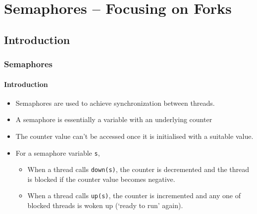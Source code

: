 \documentclass[aspectratio=169, handout, 10pt]{beamer}
\theoremstyle{example}
\begin{document}
\section{Semaphores -- Focusing on Forks}
\subsection{Introduction}
\begin{frame}[fragile]\frametitle{Semaphores}\framesubtitle{Introduction}
\begin{itemize}
\pause\item Semaphores are used to achieve synchronization between threads. 
\pause\item A semaphore is essentially a variable with an underlying counter
\pause\item The counter value can't be accessed once it is initialised with a suitable value.
\pause\item For a semaphore variable \verb!s!,
  \begin{itemize}
  \pause\item When a thread calls \verb!down(s)!, the counter is decremented and the thread is blocked if the counter value becomes negative.
  \pause\item When a thread calls \verb!up(s)!, the counter is incremented and any one of blocked threads is woken up (`ready to run' again).
  \end{itemize}
\end{itemize}
\end{frame}
\end{document}
